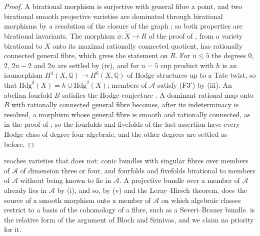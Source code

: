 \documentclass[11pt,reqno]{amsart}
\theoremstyle{plain}
\theoremstyle{definition}
\theoremstyle{remark}
\newcommand{\QQ}{\mathbb{Q}}
\newcommand{\Hdg}{\mathrm{Hdg}}
\begin{document}
\begin{proof}
A birational morphism is surjective with general fibre a point, and two
birational smooth projective varieties are dominated through birational
morphisms by a resolution of the closure of the graph \cite{Hir64}; so both
properties are birational invariants. The morphism
$\widetilde\phi\colon\widetilde X\to R$ of the proof of
, from a variety birational to $X$ onto its maximal
rationally connected quotient, has rationally connected general fibre,
which gives the statement on $R$. For $n\le5$ the degrees $0$, $2$, $2n-2$
and $2n$ are settled by (iv), and for $n=5$ cup product
with $h$ is an isomorphism $H^{4}(X,\QQ)\to H^{6}(X,\QQ)$ of Hodge structures
up to a Tate twist, so that $\Hdg^{3}(X)=h\cup\Hdg^{2}(X)$; members of
$\mathcal{A}$ satisfy \textup{(F3$'$)} by (iii). An
abelian fourfold $B$ satisfies the Hodge conjecture \cite{Mar25a,Mar25b}. A
dominant rational map onto $B$ with rationally connected general fibre
becomes, after its indeterminacy is resolved, a morphism whose general fibre
is smooth and rationally connected, as in the proof of
; so the fourfolds and fivefolds of the last
assertion have every Hodge class of degree four algebraic, and the other
degrees are settled as before.
\end{proof}

 reaches varieties that 
does not: conic bundles with singular fibres over members of $\mathcal{A}$ of
dimension three or four, and fourfolds and fivefolds birational to members
of $\mathcal{A}$ without being known to lie in $\mathcal{A}$. A projective
bundle over a member of $\mathcal{A}$ already lies in $\mathcal{A}$ by
(i), and so, by (v) and the
Leray--Hirsch theorem, does the source of a smooth morphism onto a member of
$\mathcal{A}$ on which algebraic classes restrict to a basis of the
cohomology of a fibre, such as a Severi--Brauer bundle.
 is the relative form of the argument of Bloch
and Srinivas, and we claim no priority for it.
\end{document}

